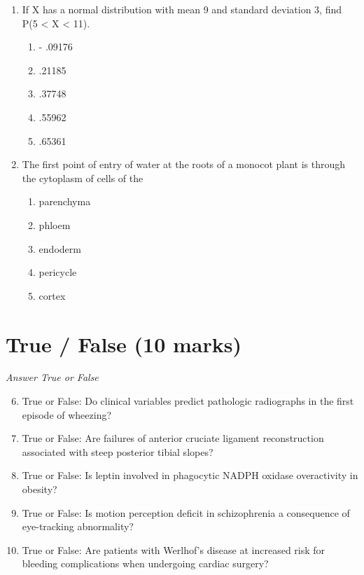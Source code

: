\documentclass[12pt]{article}
\begin{document}
\begin{enumerate}[label=\arabic*.]
\begin{enumerate}[label=(\alph*)]
\end{enumerate}
\item If X has a normal distribution with mean 9 and standard deviation 3, find P(5 \textless{} X \textless{} 11).
\begin{enumerate}[label=(\alph*)]
    \item - .09176
    \item .21185
    \item .37748
    \item .55962
    \item .65361
\end{enumerate}
\item The first point of entry of water at the roots of a monocot plant is through the cytoplasm of cells of the
\begin{enumerate}[label=(\alph*)]
    \item parenchyma
    \item phloem
    \item endoderm
    \item pericycle
    \item cortex
\end{enumerate}
\end{enumerate}

\section*{True / False (10 marks)}
\textit{Answer True or False}
\begin{enumerate}[label=\arabic*.]
\setcounter{enumi}{5}
\item True or False: Do clinical variables predict pathologic radiographs in the first episode of wheezing?
\item True or False: Are failures of anterior cruciate ligament reconstruction associated with steep posterior tibial slopes?
\item True or False: Is leptin involved in phagocytic NADPH oxidase overactivity in obesity?
\item True or False: Is motion perception deficit in schizophrenia a consequence of eye-tracking abnormality?
\item True or False: Are patients with Werlhof's disease at increased risk for bleeding complications when undergoing cardiac surgery?
\end{enumerate}
\end{document}
